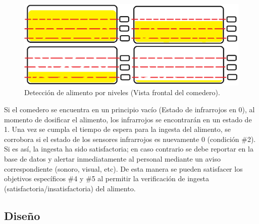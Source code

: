     \begin{figure}[H]
	    \begin{center}
	    	\includegraphics[scale=0.40]{img/infra1.png}
        \end{center}
	    \caption{Detección de alimento por niveles (Vista frontal del comedero).	
	    \label{infra1png}}
    \end{figure}
    
    Si el comedero se encuentra en un principio vacío (Estado de infrarrojos en 0), al momento de dosificar el alimento, los infrarrojos se encontrarán en un estado de 1. Una vez se cumpla el tiempo de espera para la ingesta del alimento, se corrobora si el estado de los sensores infrarrojos es nuevamente 0 (condición \#2).\\
    Si es así, la ingesta ha sido satisfactoria; en caso contrario se debe reportar en la base de datos y alertar inmediatamente al personal mediante un aviso correspondiente (sonoro, visual, etc). De esta manera se pueden satisfacer los objetivos específicos \#4 y \#5 al permitir la verificación de ingesta (satisfactoria/insatisfactoria) del alimento.
    
    
    
\subsection{Diseño}

